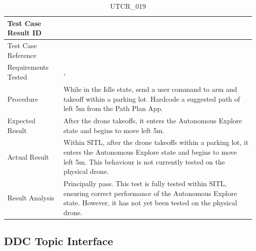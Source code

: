 \documentclass[12pt, titlepage]{article}
\begin{document}
\begin{table}[!h]
\begin{center}
\caption {UTCR\_019}
\label{tab:UTCR_019}
\begin{tabular}{ | m{3.2cm} | m{12.2cm} | } 
\hline
Test Case Result ID & \nameref{tab:UTCR_019} \\ 
\hline
Test Case Reference & \nameref{tab:UTC_019}  \\ 
\hline
Requirements Tested & \nameref{STA_003}, \nameref{TRANS_004} \\ 
\hline
Procedure & While in the Idle state, send a user command to arm and takeoff within a parking lot. Hardcode a suggested path of left 5m from the Path Plan App. \\ 
\hline
Expected Result & After the drone takeoffs, it enters the Autonomous Explore state and begins to move left 5m. \\
\hline
Actual Result & Within SITL, after the drone takeoffs within a parking lot, it enters the Autonomous Explore state and begins to move left 5m. This behaviour is not currently tested on the physical drone. \\
\hline
Result Analysis & Principally pass. This test is fully tested within SITL, ensuring correct performance of the Autonomous Explore state. However, it has not yet been tested on the physical drone. \\ 
\hline
\end{tabular}
\end{center}
\end{table}

\clearpage

\subsection{DDC Topic Interface}
\label{subsec:ddcTopicInterface}
\end{document}
